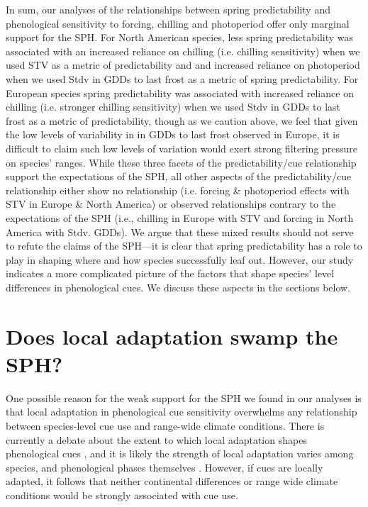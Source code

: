 \documentclass[12pt]{article}
\begin{document}
In sum, our analyses of the relationships between spring predictability and phenological sensitivity to forcing, chilling and photoperiod offer only marginal support for the SPH. For North American species, less spring predictability was associated with an increased reliance on chilling (i.e. chilling sensitivity) when we used STV as a metric of predictability and and increased reliance on photoperiod when we used Stdv in GDDs to last frost as a metric of spring predictability. For European species spring predictability was associated with increased reliance on chilling (i.e. stronger chilling sensitivity) when we used Stdv in GDDs to last frost as a metric of predictability, though as we caution above, we feel that given the low levels of variability in in GDDs to last frost observed in Europe, it is difficult to claim such low levels of variation would exert strong filtering pressure on species' ranges. While these three facets of the predictability/cue relationship support the expectations of the SPH, all other aspects of the predictability/cue relationship either show no relationship (i.e. forcing \& photoperiod effects with STV in Europe \& North America) or observed relationships contrary to the expectations of the SPH (i.e., chilling in Europe with STV and forcing in North America with Stdv. GDDs). We argue that these mixed results should not serve to refute the claims of the SPH---it is clear that spring predictability has a role to play in shaping where and how species successfully leaf out. However, our study indicates a more complicated picture of the factors that shape species' level differences in phenological cues. We discuss these aspects in the sections below.


\section*{Does local adaptation swamp the SPH?}
One possible reason for the weak support for the SPH we found in our analyses is that local adaptation in phenological cue sensitivity overwhelms any relationship between species-level cue use and range-wide climate conditions. There is currently a debate about the extent to which local adaptation shapes phenological cues \citep{Zeng2024}, and it is likely the strength of local adaptation varies among species, and phenological phases themselves \citep{Zeng2024,Savolainen2007}. However, if cues are locally adapted, it follows that neither continental differences or range wide climate conditions would be strongly associated with cue use. 
\end{document}
